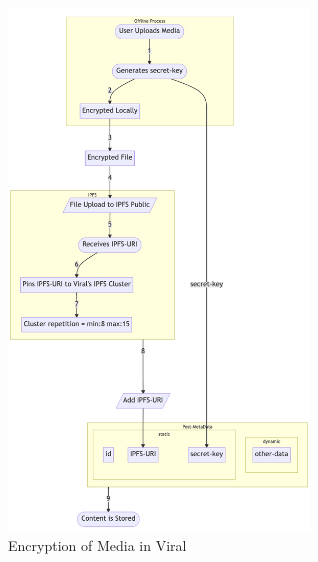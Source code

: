 \documentclass[10pt]{article}
\begin{document}
\begin{figure}[H]
\begin{center}
\includegraphics[width=8cm]{encryption}
\caption{Encryption of Media in Viral}
\end{center}
\end{figure}
\end{document}
